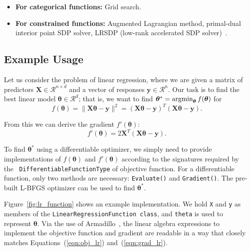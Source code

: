\begin{itemize}
  \item {\bf For categorical functions:}  Grid search.

  \item {\bf For constrained functions:}  Augmented Lagrangian method,
primal-dual interior point SDP solver, LRSDP (low-rank accelerated SDP
solver)~\cite{burer2003nonlinear}.
\end{itemize}


\subsection{Example Usage}
\label{sec:linreg_example}

Let us consider the problem of linear regression, where we are
given a matrix of predictors $\bm X \in \mathcal{R}^{n \times d}$ and a vector
of responses $\bm y \in \mathcal{R}^n$.  Our task is to find the best linear
model $\bm \theta \in \mathcal{R}^d$; that is, we want to find
$\bm \theta^* = \operatornamewithlimits{argmin}_{\bm\theta} f(\bm \theta)$ for
%
\begin{equation}
f(\bm \theta) = \| \bm X \bm \theta - \bm y \|^2 = (\bm X \bm \theta - \bm y)^T
(\bm X \bm \theta - \bm y).
\label{eqn:obj_lr}
\end{equation}

\noindent
From this we can derive the gradient $f'(\bm \theta)$:
%
\begin{equation}
f'(\bm \theta) = 2 \bm X^T (\bm X \bm \theta - \bm y).
\label{eqn:grad_lr}
\end{equation}

To find $\bm \theta^*$ using a differentiable
optimizer, we simply need to provide implementations of $f(\bm \theta)$ and
$f'(\bm \theta)$ according to the signatures required by the {\tt
DifferentiableFunctionType} of objective function.  For a differentiable
function, only two methods are necessary: {\tt Evaluate()} and {\tt Gradient()}.
The pre-built L-BFGS optimizer can be used to find $\bm \theta^*$.

Figure~\ref{fig:lr_function} shows an example implementation.
We hold {\tt X} and {\tt y} as members of the
{\tt LinearRegressionFunction class},
and {\tt theta} is used to represent $\bm \theta$.
Via the use of Armadillo~\cite{sanderson2016armadillo},
the linear algebra expressions to implement the objective function and gradient
are readable in a way that closely matches Equations~(\ref{eqn:obj_lr}) and~(\ref{eqn:grad_lr}).


